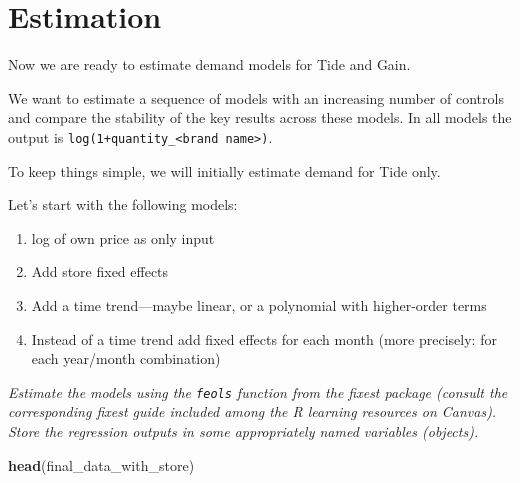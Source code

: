 \documentclass[
]{article}
\newenvironment{Shaded}{\begin{snugshade}}{\end{snugshade}}
\newcommand{\FunctionTok}[1]{\textcolor[rgb]{0.13,0.29,0.53}{\textbf{#1}}}
\newcommand{\NormalTok}[1]{#1}
\providecommand{\tightlist}{%
  \setlength{\itemsep}{0pt}\setlength{\parskip}{0pt}}
\begin{document}
\newpage

\section{Estimation}\label{estimation}

Now we are ready to estimate demand models for Tide and Gain.

We want to estimate a sequence of models with an increasing number of
controls and compare the stability of the key results across these
models. In all models the output is
\texttt{log(1+quantity\_\textless{}brand\ name\textgreater{})}.

\bigskip

To keep things simple, we will initially estimate demand for Tide only.

Let's start with the following models:

\begin{enumerate}
\def\labelenumi{\arabic{enumi}.}
\tightlist
\item
  log of own price as only input
\item
  Add store fixed effects
\item
  Add a time trend---maybe linear, or a polynomial with higher-order
  terms
\item
  Instead of a time trend add fixed effects for each month (more
  precisely: for each year/month combination)
\end{enumerate}

\emph{Estimate the models using the \texttt{feols} function from the
fixest package (consult the corresponding fixest guide included among
the R learning resources on Canvas). Store the regression outputs in
some appropriately named variables (objects).}

\begin{Shaded}
\begin{Highlighting}[]
\FunctionTok{head}\NormalTok{(final\_data\_with\_store)}
\end{Highlighting}
\end{Shaded}
\end{document}
